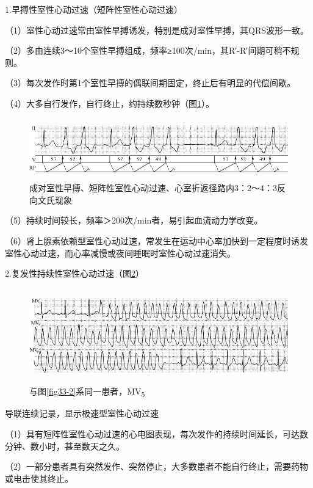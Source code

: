 1.早搏性室性心动过速（短阵性室性心动过速）

（1）室性心动过速常由室性早搏诱发，特别是成对室性早搏，其QRS波形一致。

（2）多由连续3～10个室性早搏组成，频率≥100次/min，其R′-R′间期可稍不规则。

（3）每次发作时第1个室性早搏的偶联间期固定，终止后有明显的代偿间歇。

（4）大多自行发作，自行终止，约持续数秒钟（图\ref{fig33-4}）。

\begin{figure}[!htbp]
 \centering
 \includegraphics[width=5.69792in,height=1.04167in]{./images/Image00533.jpg}
 \captionsetup{justification=centering}
 \caption{成对室性早搏、短阵性室性心动过速、心室折返径路内3：2～4：3反向文氏现象}
 \label{fig33-4}
  \end{figure} 

（5）持续时间较长，频率＞200次/min者，易引起血流动力学改变。

（6）肾上腺素依赖型室性心动过速，常发生在运动中心率加快到一定程度时诱发室性心动过速，而心率减慢或夜间睡眠时室性心动过速消失。

2.复发性持续性室性心动过速（图\ref{fig33-5}）

\begin{figure}[!htbp]
 \centering
 \includegraphics[width=5.67708in,height=1.61458in]{./images/Image00534.jpg}
 \captionsetup{justification=centering}
 \caption{与图\ref{fig33-2}系同一患者，MV\textsubscript{5}}
 \label{fig33-5}
  \end{figure} 
导联连续记录，显示极速型室性心动过速

（1）具有短阵性室性心动过速的心电图表现，每次发作的持续时间延长，可达数分钟、数小时，甚至数天之久。

（2）一部分患者具有突然发作、突然停止，大多数患者不能自行终止，需要药物或电击使其终止。

